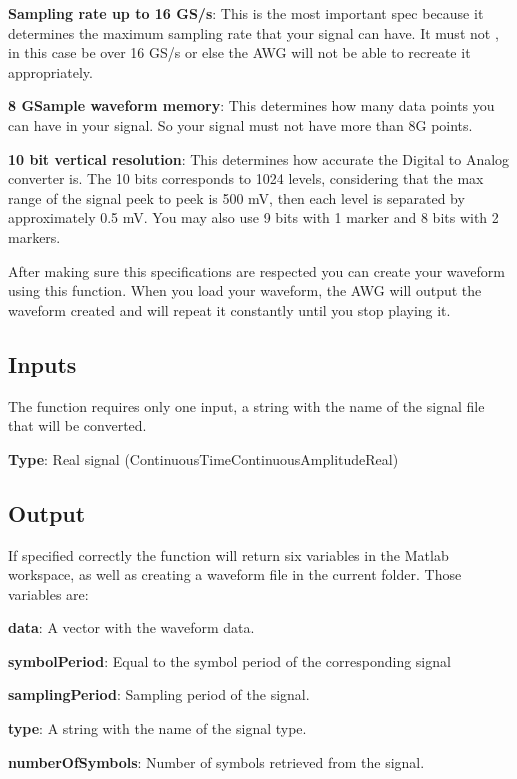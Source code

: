 \textbf{Sampling rate up to 16 GS/s}: This is the most important spec because it determines the maximum sampling rate that your signal can have. It must not , in this case be over 16 GS/s or else the AWG will not be able to recreate it appropriately.

\textbf{8 GSample waveform memory}: This determines how many data points you can have in your signal. So your signal must not have more than 8G points.
\bigskip

\textbf{10 bit vertical resolution}: This determines how accurate the Digital to Analog converter is. The 10 bits corresponds to 1024 levels, considering that the max range of the signal peek to peek is 500 mV, then each level is separated by approximately 0.5 mV. You may also use 9 bits with 1 marker and 8 bits with 2 markers.
\bigskip



After making sure this specifications are respected you can create your waveform using this function. When you load your waveform, the AWG will output the waveform created and will repeat it constantly until you stop playing it.


\subsection*{Inputs}

The function requires only one input, a string with the name of the signal file that will be converted.


\textbf{Type}: Real signal (ContinuousTimeContinuousAmplitudeReal)

\subsection*{Output}

If specified correctly the function will return six variables in the Matlab workspace, as well as creating a waveform file in the current folder.
Those variables are:

\bigskip

\textbf{data}: A vector with the waveform data.
\bigskip

\textbf{symbolPeriod}: Equal to the symbol period of the corresponding signal
\bigskip

\textbf{samplingPeriod}: Sampling period of the signal.
\bigskip

\textbf{type}: A string with the name of the signal type.
\bigskip

\textbf{numberOfSymbols}: Number of symbols retrieved from the signal.
\bigskip

